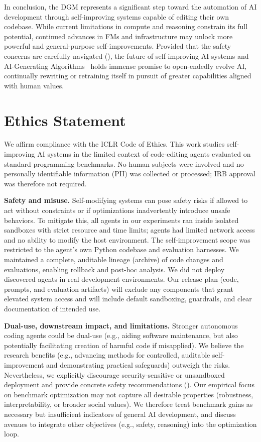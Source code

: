 \documentclass{article}
\begin{document}
In conclusion, the DGM represents a significant step toward the automation of AI development through self-improving systems capable of editing their own codebase. While current limitations in compute and reasoning constrain its full potential, continued advances in FMs and infrastructure may unlock more powerful and general-purpose self-improvements. Provided that the safety concerns are carefully navigated (), the future of self-improving AI systems and AI-Generating Algorithms~\citep{clune2019ai} holds immense promise to open-endedly evolve AI, continually rewriting or retraining itself in pursuit of greater capabilities aligned with human values.

\newpage

\section*{Ethics Statement}

We affirm compliance with the ICLR Code of Ethics. This work studies self-improving AI systems in the limited context of code-editing agents evaluated on standard programming benchmarks. No human subjects were involved and no personally identifiable information (PII) was collected or processed; IRB approval was therefore not required.

\textbf{Safety and misuse.}
Self-modifying systems can pose safety risks if allowed to act without constraints or if optimizations inadvertently introduce unsafe behaviors. To mitigate this, all agents in our experiments ran inside isolated sandboxes with strict resource and time limits; agents had limited network access and no ability to modify the host environment. The self-improvement scope was restricted to the agent’s own Python codebase and evaluation harnesses. We maintained a complete, auditable lineage (archive) of code changes and evaluations, enabling rollback and post-hoc analysis. We did not deploy discovered agents in real development environments. Our release plan (code, prompts, and evaluation artifacts) will exclude any components that grant elevated system access and will include default sandboxing, guardrails, and clear documentation of intended use.

\textbf{Dual-use, downstream impact, and limitations.}
Stronger autonomous coding agents could be dual-use (e.g., aiding software maintenance, but also potentially facilitating creation of harmful code if misapplied). We believe the research benefits (e.g., advancing methods for controlled, auditable self-improvement and demonstrating practical safeguards) outweigh the risks. Nevertheless, we explicitly discourage security-sensitive or unsandboxed deployment and provide concrete safety recommendations (). Our empirical focus on benchmark optimization may not capture all desirable properties (robustness, interpretability, or broader social values). We therefore treat benchmark gains as necessary but insufficient indicators of general AI development, and discuss avenues to integrate other objectives (e.g., safety, reasoning) into the optimization loop.
\end{document}
